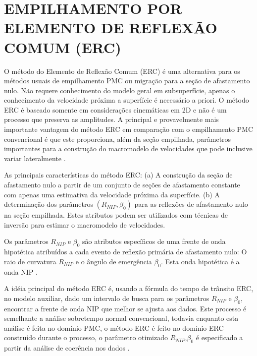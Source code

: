 %
% 
% 
% 
% 
% 
% 

\chapter{EMPILHAMENTO POR ELEMENTO DE REFLEXÃO COMUM (ERC)}

O método do Elemento de Reflexão Comum (ERC) é uma alternativa para os métodos usuais de empilhamento PMC ou
migração para a seção de afastamento nulo. Não requere conhecimento do modelo geral em subsuperfície, apenas
o conhecimento da velocidade próxima a superfície é necessário a priori.
O método ERC é baseado somente em considerações cinemáticas em 2D e não é
um processo que preserva as amplitudes.
A principal e provavelmente mais importante vantagem do método ERC em comparação com o empilhamento PMC convencional
é que este proporciona, além da seção empilhada, parâmetros importantes para a construção do macromodelo de 
velocidades que pode inclusive variar lateralmente \cite{cre}.

As principais características do método ERC:
(a) A construção da seção de afastamento nulo a partir de um conjunto de seções de afastamento constante
com apenas uma estimativa da velocidade próxima da superfície.
(b) A determinação dos parâmetros $(R_{NIP},\beta_0)$ para as reflexões de afastamento nulo na seção empilhada.
Estes atributos podem ser utilizados com técnicas de inversão para estimar o macromodelo de velocidades.

Os parâmetros $R_{NIP}$ e $\beta_0$ 
são atributos específicos de uma frente de onda hipotética atribuídos a cada evento de reflexão
primária de afastamento nulo: O raio de curvatura $R_{NIP}$ e o ângulo de emergência $\beta_0$. Esta onda hipotética é
a onda NIP \cite{hubral}.

A idéia principal do método ERC é, usando a fórmula do tempo de trânsito ERC, no modelo auxiliar, dado um intervalo
de busca para os parâmetros $R_{NIP}$ e $\beta_0$, encontrar a frente de onda NIP que melhor se ajusta aos dados.
Este processo é semelhante a análise sobretempo normal convencional, todavia enquanto esta análise é feita no
domínio PMC, o método ERC é feito no domínio ERC construído durante o processo, o parâmetro otimizado $R_{NIP}$,$\beta_0$
é especificado a partir da análise de coerência nos dados \cite{cre}.

